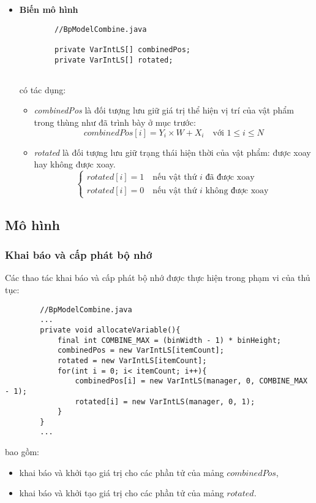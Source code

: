 \begin{itemize}
	\item \textbf{Biến mô hình}
	\begin{lstlisting}
		//BpModelCombine.java
	
		private VarIntLS[] combinedPos;
		private VarIntLS[] rotated;
		
	\end{lstlisting}
	có tác dụng:
	\begin{itemize}
		\item \textit{combinedPos} là đối tượng lưu giữ giá trị thể hiện vị trí của vật phẩm trong thùng như đã trình bày ở mục trước: \[combinedPos[i] = Y_i \times W + X_i \quad \text{với } 1 \leq i \leq N\]
		\item \textit{rotated} là đối tượng lưu giữ trạng thái hiện thời của vật phẩm: được xoay hay không được xoay.
		\[		
		\begin{cases}
			rotated[i] = 1 \quad \text{nếu vật thứ $i$ đã được xoay} \\
			rotated[i] = 0 \quad \text{nếu vật thứ $i$ không được xoay}
		\end{cases}
		\]
	\end{itemize}
\end{itemize}

\subsection{Mô hình}
\subsubsection{Khai báo và cấp phát bộ nhớ}
	Các thao tác khai báo và cấp phát bộ nhớ được thực hiện trong phạm vi của thủ tục:
	\begin{lstlisting}
		//BpModelCombine.java
		...
		private void allocateVariable(){
			final int COMBINE_MAX = (binWidth - 1) * binHeight;
			combinedPos = new VarIntLS[itemCount];
			rotated = new VarIntLS[itemCount];
			for(int i = 0; i< itemCount; i++){
				combinedPos[i] = new VarIntLS(manager, 0, COMBINE_MAX - 1);
				rotated[i] = new VarIntLS(manager, 0, 1);
			}
		}
		...
	\end{lstlisting}
	bao gồm:
	\begin{itemize}
		\item khai báo và khởi tạo giá trị cho các phần tử của mảng $combinedPos$,
		\item khai báo và khởi tạo giá trị cho các phần tử của mảng $rotated$.
	\end{itemize}

